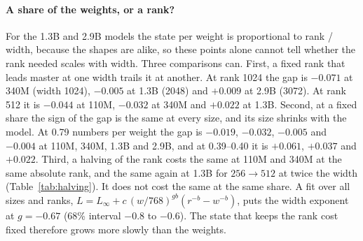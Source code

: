 \documentclass[10pt,twocolumn]{article}
\begin{document}
\begin{table}[t]
\caption{Cost of halving the rank: the loss difference between neighbouring ranks (fixed windows, Wikipedia). 1.3B:
the final recipe up to rank 512, $p=0.5$ for $512\to1024$. 2.9B: FineWeb-Edu, the $1024\to1536$ step (0.014) scaled to a
full halving.}
\label{tab:halving}
\end{table}

\paragraph{A share of the weights, or a rank?} For the 1.3B and 2.9B models the state per weight is proportional to rank /
width, because the shapes are alike, so these points alone cannot tell whether the rank needed scales with width. Three
comparisons can. First, a fixed rank that leads master at one width trails it at another. At rank 1024 the gap is
$-0.071$ at 340M (width 1024), $-0.005$ at 1.3B (2048) and $+0.009$ at 2.9B (3072). At rank 512 it is $-0.044$ at 110M,
$-0.032$ at 340M and $+0.022$ at 1.3B. Second, at a fixed share the sign of the gap is the same at every size, and its
size shrinks with the model. At 0.79 numbers per weight the gap is $-0.019$, $-0.032$, $-0.005$ and $-0.004$ at 110M,
340M, 1.3B and 2.9B, and at 0.39--0.40 it is $+0.061$, $+0.037$ and $+0.022$. Third, a halving of the rank costs the same
at 110M and 340M at the same absolute rank, and the same again at 1.3B for $256\to512$ at twice the width
(Table~\ref{tab:halving}). It does not cost the same at the same share. A fit over all sizes and ranks,
$L = L_\infty + c\,(w/768)^{gb}(r^{-b} - w^{-b})$, puts the width exponent at $g=-0.67$ (68\% interval $-0.8$ to $-0.6$).
The state that keeps the rank cost fixed therefore grows more slowly than the weights.
\end{document}
